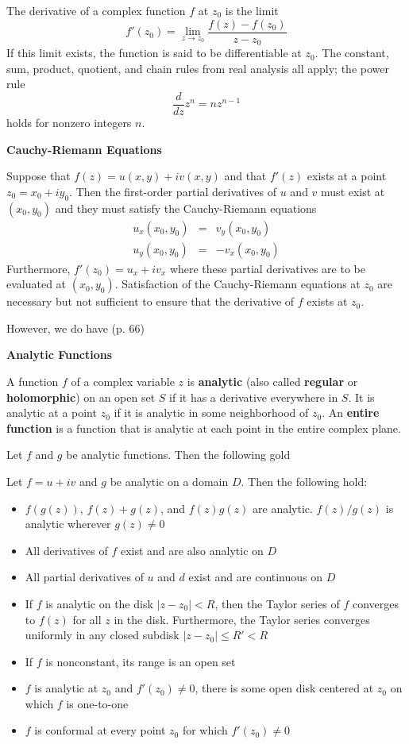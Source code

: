 The derivative of a complex function $f$ at $z_0$ is the limit $$f'(z_0) = \lim_{z \to z_0} \frac{f(z) - f(z_0)}{z - z_0}$$ If this limit exists, the function is said to be differentiable at $z_0$. The constant, sum, product, quotient, and chain rules from real analysis all apply; the power rule $$\frac{d}{dz} z^n = nz^{n-1}$$ holds for nonzero integers $n$.

\textbf{Cauchy-Riemann Equations}

Suppose that $f(z) = u(x,y) + iv(x,y)$ and that $f'(z)$ exists at a point $z_0 = x_0 + iy_0$. Then the first-order partial derivatives of $u$ and $v$ must exist at $(x_0, y_0)$ and they must satisfy the Cauchy-Riemann equations $$\begin{array}{ccr}
	u_x(x_0,y_0) &=& v_y(x_0,y_0)\\
	u_y(x_0,y_0) &=& -v_x(x_0,y_0)
\end{array}$$ Furthermore, $f'(z_0) = u_x + iv_x$ where these partial derivatives are to be evaluated at $(x_0, y_0)$. Satisfaction of the Cauchy-Riemann equations at $z_0$ are necessary but not sufficient to ensure that the derivative of $f$ exists at $z_0$.

However, we do have (p. 66)

\textbf{Analytic Functions}

A function $f$ of a complex variable $z$ is \textbf{analytic} (also called \textbf{regular} or \textbf{holomorphic}) on an open set $S$ if it has a derivative everywhere in $S$. It is analytic at a point $z_0$ if it is analytic in some neighborhood of $z_0$. An \textbf{entire function} is a function that is analytic at each point in the entire complex plane.

Let $f$ and $g$ be analytic functions. Then the following gold

 Let $f = u + iv$ and $g$ be analytic on a domain $D$. Then the following hold: \begin{itemize}
	\item $f(g(z))$, $f(z) + g(z)$, and $f(z)g(z)$ are analytic. $f(z)/g(z)$ is analytic wherever $g(z) \neq 0$
	\item All derivatives of $f$ exist and are also analytic on $D$
	\item All partial derivatives of $u$ and $d$ exist and are continuous on $D$
	\item If $f$ is analytic on the disk $|z - z_0| < R$, then the Taylor series of $f$ converges to $f(z)$ for all $z$ in the disk. Furthermore, the Taylor series converges uniformly in any closed subdisk $|z - z_0| \leq R' < R$
	\item If $f$ is nonconstant, its range is an open set
	\item $f$ is analytic at $z_0$ and $f'(z_0) \neq 0$, there is some open disk centered at $z_0$ on which $f$ is one-to-one
	\item $f$ is conformal at every point $z_0$ for which $f'(z_0) \neq 0$
\end{itemize}


